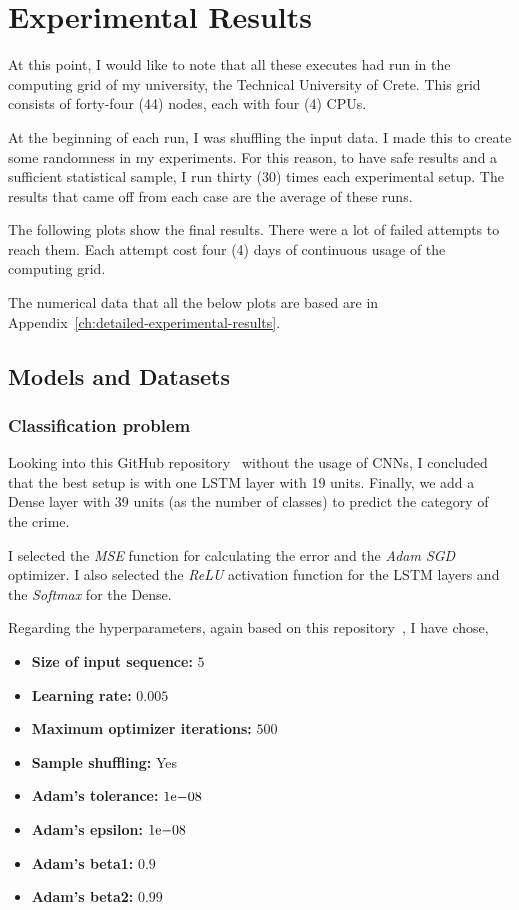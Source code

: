 \chapter{Experimental Results}\label{ch:experimental-results}

At this point, I would like to note that all these executes had run in the computing grid of my university, the Technical University of Crete.
This grid consists of forty-four (44) nodes, each with four (4) CPUs.

At the beginning of each run, I was shuffling the input data.
I made this to create some randomness in my experiments.
For this reason, to have safe results and a sufficient statistical sample, I run thirty (30) times each experimental setup.
The results that came off from each case are the average of these runs.

The following plots show the final results.
There were a lot of failed attempts to reach them.
Each attempt cost four (4) days of continuous usage of the computing grid.

The numerical data that all the below plots are based are in Appendix~\ref{ch:detailed-experimental-results}.


\section{Models and Datasets}\label{sec:models-and-datasets}

\subsection{Classification problem}\label{subsec:classification-problem}

Looking into this GitHub repository~\cite{cnn_rnn_repo} without the usage of CNNs, I concluded that the best setup is with one LSTM layer with 19 units.
Finally, we add a Dense layer with 39 units (as the number of classes) to predict the category of the crime.

I selected the \emph{MSE} function for calculating the error and the \emph{Adam SGD} optimizer.
I also selected the \emph{ReLU} activation function for the LSTM layers and the \emph{Softmax} for the Dense.

\newpage

Regarding the hyperparameters, again based on this repository~\cite{cnn_rnn_repo}, I have chose,
\begin{itemize}
    \item \textbf{Size of input sequence:} $5$
    \item \textbf{Learning rate:} $0.005$
    \item \textbf{Maximum optimizer iterations:} $500$
    \item \textbf{Sample shuffling:} Yes
    \item \textbf{Adam's tolerance:} ${1}\mathrm{e}{-08}$
    \item \textbf{Adam's epsilon:} ${1}\mathrm{e}{-08}$
    \item \textbf{Adam's beta1:} $0.9$
    \item \textbf{Adam's beta2:} $0.99$
\end{itemize}

